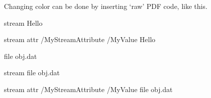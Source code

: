 
\pdfincludechars{}


Changing color can be done by inserting `raw' PDF code, like 
this.                       %


\pdfrefobj \pdflastobj      %


\immediate \pdfobj stream   %
   {Hello}                  %
    

\pdfobj stream              %
    attr {/MyStreamAttribute /MyValue} %
    {Hello}
\pdfrefobj \pdflastobj

\pdfobj file {obj.dat}      %
\pdfrefobj \pdflastobj

\pdfobj stream              %
    file {obj.dat}
\pdfrefobj \pdflastobj

\pdfobj stream              %
    attr {/MyStreamAttribute /MyValue} %
    file {obj.dat}
\pdfrefobj \pdflastobj



